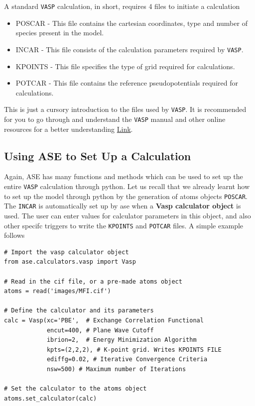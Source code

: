 \documentclass[11pt]{article}
\begin{document}
A standard \texttt{VASP} calculation, in short, requires 4 files to initiate a calculation
\begin{itemize}
\item POSCAR - This file contains the cartesian coordinates, type and number of species present in the model.
\item INCAR - This file consists of the calculation parameters required by \texttt{VASP}.
\item KPOINTS - This file specifies the type of grid required for calculations.
\item POTCAR - This file contains the reference pseudopotentials required for calculations.
\end{itemize}

This is just a cursory introduction to the files used by \texttt{VASP}. It is recommended for you to go through and understand the \texttt{VASP} manual and other online resources for a better understanding \href{https://www.vasp.at/index.php/documentation}{Link}. 

\subsection{Using ASE to Set Up a Calculation}
\label{sec-6-2}
Again, ASE has many functions and methods which can be used to set up the entire \texttt{VASP} calculation through python. Let us recall that we already learnt how to set up the model through python by the generation of atoms objects \texttt{POSCAR}. The \texttt{INCAR} is automatically set up by ase when a \textbf{Vasp calculator object} is used. The user can enter values for calculator parameters in this object, and also other specifc triggers to write the \texttt{KPOINTS} and \texttt{POTCAR} files. A simple example follows

\begin{verbatim}
# Import the vasp calculator object
from ase.calculators.vasp import Vasp

# Read in the cif file, or a pre-made atoms object
atoms = read('images/MFI.cif')

# Define the calculator and its parameters
calc = Vasp(xc='PBE',  # Exchange Correlation Functional
            encut=400, # Plane Wave Cutoff
            ibrion=2,  # Energy Minimization Algorithm
            kpts=(2,2,2), # K-point grid. Writes KPOINTS FILE
            ediffg=0.02, # Iterative Convergence Criteria
            nsw=500) # Maximum number of Iterations

# Set the calculator to the atoms object
atoms.set_calculator(calc)
\end{verbatim}
\end{document}
